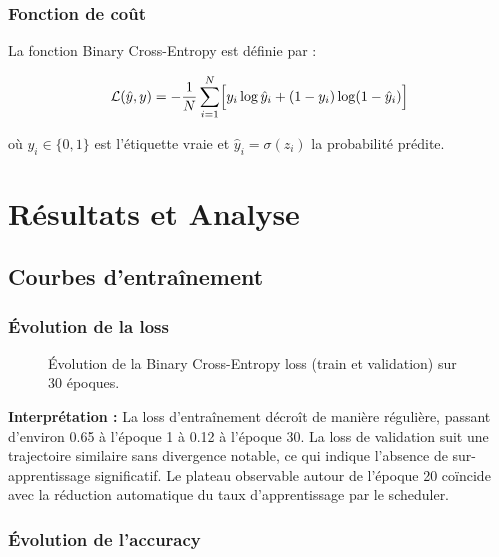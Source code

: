 \documentclass[12pt, a4paper]{report}
\begin{document}
\subsection{Fonction de coût}

La fonction Binary Cross-Entropy est définie par :

\[
  \mathcal{L}(\hat{y}, y) =
  -\frac{1}{N}\sum_{i=1}^{N}
  \Bigl[y_i \log\hat{y}_i + (1 - y_i)\log(1 - \hat{y}_i)\Bigr]
\]

où $y_i \in \{0, 1\}$ est l'étiquette vraie et $\hat{y}_i = \sigma(z_i)$ la probabilité prédite.

\chapter{Résultats et Analyse}
\label{chap:resultats}

\section{Courbes d'entraînement}

\subsection{Évolution de la loss}

\begin{figure}[h]
  \centering
  \caption{Évolution de la Binary Cross-Entropy loss (train et validation) sur 30 époques.}
  \label{fig:loss_curve}
\end{figure}

\textbf{Interprétation :} La loss d'entraînement décroît de manière régulière,
passant d'environ 0.65 à l'époque 1 à 0.12 à l'époque 30.
La loss de validation suit une trajectoire similaire sans divergence notable,
ce qui indique l'absence de sur-apprentissage significatif.
Le plateau observable autour de l'époque 20 coïncide avec la réduction automatique
du taux d'apprentissage par le scheduler.

\subsection{Évolution de l'accuracy}
\end{document}

